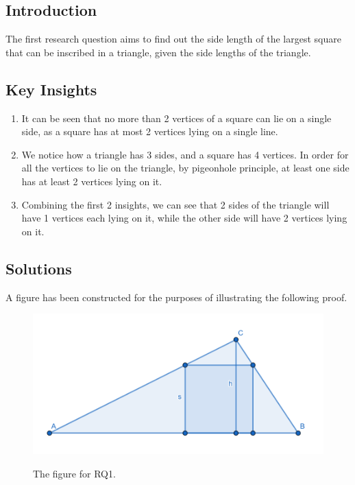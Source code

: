 \documentclass[12pt]{scrartcl}
\begin{document}
\subsection{Introduction}
The first research question aims to find out the side length of the largest square that can be inscribed in a triangle, given the side lengths of the triangle.

\subsection{Key Insights}
\begin{enumerate}
	\item It can be seen that no more than 2 vertices of a square can lie on a single side, as a square has at most 2 vertices lying on a single line.
	\item We notice how a triangle has 3 sides, and a square has 4 vertices. In order for all the vertices to lie on the triangle, by pigeonhole principle, at least one side has at least 2 vertices lying on it.
	\item Combining the first 2 insights, we can see that 2 sides of the triangle will have 1 vertices each lying on it, while the other side will have 2 vertices lying on it.
\end{enumerate}

\subsection{Solutions}
A figure has been constructed for the purposes of illustrating the following proof.
\begin{figure}[htpb]
\centering
\includegraphics[scale=.75]{rq1}
\label{fig:rq1_img}
\caption{The figure for RQ1.}
\end{figure}
\end{document}
